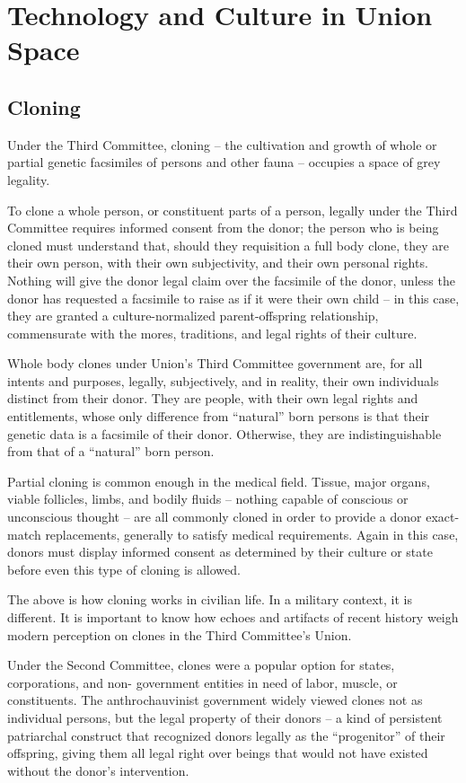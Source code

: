 \newpage
\section{Technology and Culture in Union Space}

\subsection{Cloning}

Under the Third Committee, cloning -- the cultivation and growth of whole or partial genetic
facsimiles of persons and other fauna -- occupies a space of grey legality.

To clone a whole person, or constituent parts of a person, legally under the Third Committee
requires informed consent from the donor; the person who is being cloned must understand that,
should they requisition a full body clone, they are their own person, with their own subjectivity,
and their own personal rights. Nothing will give the donor legal claim over the facsimile of the
donor, unless the donor has requested a facsimile to raise as if it were their own child -- in this
case, they are granted a culture-normalized parent-offspring relationship, commensurate with the
mores, traditions, and legal rights of their culture.

Whole body clones under Union's Third Committee government are, for all intents and purposes,
legally, subjectively, and in reality, their own individuals distinct from their donor. They are people,
with their own legal rights and entitlements, whose only difference from ``natural'' born persons is
that their genetic data is a facsimile of their donor. Otherwise, they are indistinguishable from that
of a ``natural'' born person.

Partial cloning is common enough in the medical field. Tissue, major organs, viable follicles,
limbs, and bodily fluids -- nothing capable of conscious or unconscious thought -- are all
commonly cloned in order to provide a donor exact-match replacements, generally to satisfy
medical requirements. Again in this case, donors must display informed consent as determined
by their culture or state before even this type of cloning is allowed.

The above is how cloning works in civilian life. In a military context, it is different. It is important
to know how echoes and artifacts of recent history weigh modern perception on clones in the
Third Committee's Union.

Under the Second Committee, clones were a popular option for states, corporations, and non-
government entities in need of labor, muscle, or constituents. The anthrochauvinist government
widely viewed clones not as individual persons, but the legal property of their donors -- a kind of
persistent patriarchal construct that recognized donors legally as the ``progenitor'' of their
offspring, giving them all legal right over beings that would not have existed without the donor's
intervention.

